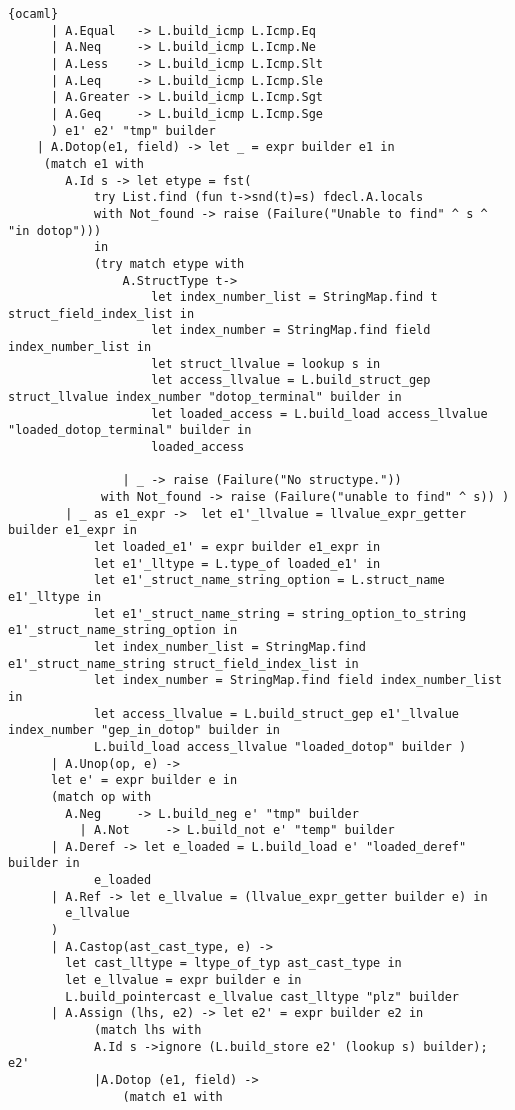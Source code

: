 \begin{lstlisting}{ocaml}
	  | A.Equal   -> L.build_icmp L.Icmp.Eq
	  | A.Neq     -> L.build_icmp L.Icmp.Ne
	  | A.Less    -> L.build_icmp L.Icmp.Slt
	  | A.Leq     -> L.build_icmp L.Icmp.Sle
	  | A.Greater -> L.build_icmp L.Icmp.Sgt
	  | A.Geq     -> L.build_icmp L.Icmp.Sge
	  ) e1' e2' "tmp" builder
    | A.Dotop(e1, field) -> let _ = expr builder e1 in
	 (match e1 with
		A.Id s -> let etype = fst( 
			try List.find (fun t->snd(t)=s) fdecl.A.locals
			with Not_found -> raise (Failure("Unable to find" ^ s ^ "in dotop")))
			in
			(try match etype with
				A.StructType t->
					let index_number_list = StringMap.find t struct_field_index_list in
					let index_number = StringMap.find field index_number_list in
					let struct_llvalue = lookup s in
					let access_llvalue = L.build_struct_gep struct_llvalue index_number "dotop_terminal" builder in
					let loaded_access = L.build_load access_llvalue "loaded_dotop_terminal" builder in
					loaded_access

				| _ -> raise (Failure("No structype."))
			 with Not_found -> raise (Failure("unable to find" ^ s)) )
		| _ as e1_expr ->  let e1'_llvalue = llvalue_expr_getter builder e1_expr in
			let loaded_e1' = expr builder e1_expr in
			let e1'_lltype = L.type_of loaded_e1' in
			let e1'_struct_name_string_option = L.struct_name e1'_lltype in
			let e1'_struct_name_string = string_option_to_string e1'_struct_name_string_option in
			let index_number_list = StringMap.find e1'_struct_name_string struct_field_index_list in
			let index_number = StringMap.find field index_number_list in
			let access_llvalue = L.build_struct_gep e1'_llvalue index_number "gep_in_dotop" builder in
			L.build_load access_llvalue "loaded_dotop" builder )
      | A.Unop(op, e) ->
	  let e' = expr builder e in
	  (match op with
	    A.Neg     -> L.build_neg e' "tmp" builder
          | A.Not     -> L.build_not e' "temp" builder
	  | A.Deref -> let e_loaded = L.build_load e' "loaded_deref" builder in
			e_loaded
	  | A.Ref -> let e_llvalue = (llvalue_expr_getter builder e) in
		e_llvalue
	  )
      | A.Castop(ast_cast_type, e) ->
 		let cast_lltype = ltype_of_typ ast_cast_type in
		let e_llvalue = expr builder e in
		L.build_pointercast e_llvalue cast_lltype "plz" builder
      | A.Assign (lhs, e2) -> let e2' = expr builder e2 in
			(match lhs with
			A.Id s ->ignore (L.build_store e2' (lookup s) builder); e2'
			|A.Dotop (e1, field) ->
				(match e1 with 			
					

\end{lstlisting}
